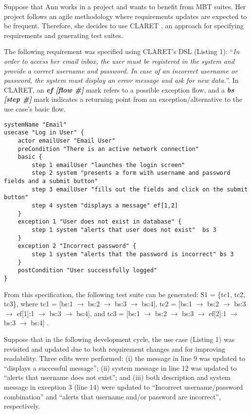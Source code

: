 Suppose that Ann works in a project and wants to benefit from MBT suites. Her project follows an agile methodology where requirements updates are expected to be frequent. Therefore, she decides to use CLARET \citep{dalton2018mbtagile}, an approach for specifying requirements and generating test suites. 

The following requirement was specified using CLARET's DSL (Listing 1): ``{\it In order to access her email inbox, the user must be registered in the system and provide a correct username and password. In case of an incorrect username or password, the system must display an error message and ask for new data.}''. In CLARET, an \textit{\textbf{ef [flow \#]}} mark refers to a possible exception flow, and a \textbf{\textit{bs [step \#]}} mark indicates a returning point from an exception/alternative to the use case's basic flow.

 \lstset{style=mystyle, language=claret}  \begin{lstlisting}[float=b,caption=Use Case specification using CLARET.]
systemName "Email"
usecase "Log in User" {
    actor emailUser "Email User"
    preCondition "There is an active network connection"
    basic {
        step 1 emailUser "launches the login screen"
        step 2 system "presents a form with username and password fields and a submit button"
        step 3 emailUser "fills out the fields and click on the submit button"
        step 4 system "displays a message" ef[1,2]
    }
    exception 1 "User does not exist in database" {
        step 1 system "alerts that user does not exist"  bs 3
    }
    exception 2 "Incorrect password" {
        step 1 system "alerts that the password is incorrect" bs 3
    }
    postCondition "User successfully logged"
}
\end{lstlisting} \label{specExample}

From this specification, the following test suite can be generated: S1 = \{tc1, tc2, tc3\}, where tc1 = [bs:1 $\rightarrow$ bs:2 $\rightarrow$ bs:3 $\rightarrow$ bs:4], tc2 = [bs:1 $\rightarrow$ bs:2 $\rightarrow$ bs:3 $\rightarrow$ ef[1]:1 $\rightarrow$ bs:3 $\rightarrow$ bs:4], and tc3 = [bs:1 $\rightarrow$ bs:2 $\rightarrow$ bs:3 $\rightarrow$ ef[2]:1 $\rightarrow$ bs:3 $\rightarrow$ bs:4] .

Suppose that in the following development cycle, the use case (Listing 1) was revisited and updated due to both requirement changes and for improving readability. Three edits were performed: (i) the message in line 9 was updated to ``displays a successful message''; (ii) system message in line 12 was updated to ``alerts that username does not exist''; and (iii) both description and system message in exception 3 (line 14) were updated to ``Incorrect username/password combination'' and ``alerts that username and/or password are incorrect'', respectively. 

